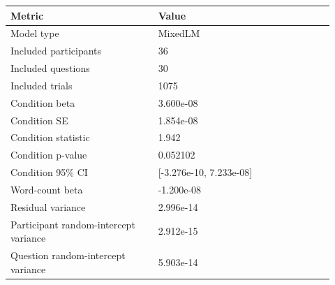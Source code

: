 \begin{tabular}{p{0.42\linewidth}p{0.50\linewidth}}
\toprule
Metric & Value\\
\midrule
Model type & MixedLM\\
Included participants & 36\\
Included questions & 30\\
Included trials & 1075\\
Condition beta & 3.600e-08\\
Condition SE & 1.854e-08\\
Condition statistic & 1.942\\
Condition p-value & 0.052102\\
Condition 95\% CI & [-3.276e-10, 7.233e-08]\\
Word-count beta & -1.200e-08\\
Residual variance & 2.996e-14\\
Participant random-intercept variance & 2.912e-15\\
Question random-intercept variance & 5.903e-14\\
\bottomrule
\end{tabular}

